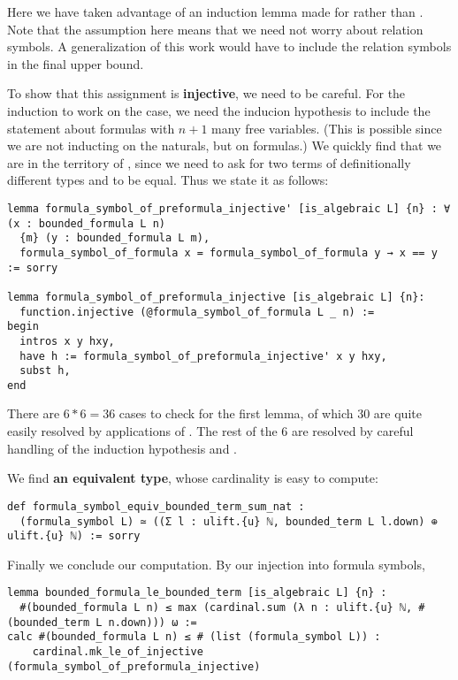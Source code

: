 Here we have taken advantage of an induction lemma made for 
rather than .
Note that the assumption  here means that we need not
worry about relation symbols.
A generalization of this work would have to include the relation symbols
in the final upper bound.

To show that this assignment is \textbf{injective},
we need to be careful.
For the induction to work on the  case,
we need the inducion hypothesis to include the statement about formulas
with $n+1$ many free variables.
(This is possible since we are not inducting on the naturals, but on formulas.)
We quickly find that we are in the territory of ,
since we need to ask for two terms of definitionally different types
 and  to be equal.
Thus we state it as follows:

\begin{lstlisting}
lemma formula_symbol_of_preformula_injective' [is_algebraic L] {n} : ∀ (x : bounded_formula L n)
  {m} (y : bounded_formula L m),
  formula_symbol_of_formula x = formula_symbol_of_formula y → x == y := sorry

lemma formula_symbol_of_preformula_injective [is_algebraic L] {n}:
  function.injective (@formula_symbol_of_formula L _ n) :=
begin
  intros x y hxy,
  have h := formula_symbol_of_preformula_injective' x y hxy,
  subst h,
end \end{lstlisting}

There are $6 * 6 = 36$ cases to check for the first lemma,
of which $30$ are quite easily resolved by applications of
.
The rest of the $6$ are resolved by careful handling of the induction
hypothesis and .

We find \textbf{an equivalent type}, whose cardinality is easy to compute:

\begin{lstlisting}
def formula_symbol_equiv_bounded_term_sum_nat :
  (formula_symbol L) ≃ ((Σ l : ulift.{u} ℕ, bounded_term L l.down) ⊕ ulift.{u} ℕ) := sorry \end{lstlisting}

Finally we conclude our computation.
By our injection into formula symbols,

\begin{lstlisting}
lemma bounded_formula_le_bounded_term [is_algebraic L] {n} :
  #(bounded_formula L n) ≤ max (cardinal.sum (λ n : ulift.{u} ℕ, #(bounded_term L n.down))) ω :=
calc #(bounded_formula L n) ≤ # (list (formula_symbol L)) :
    cardinal.mk_le_of_injective (formula_symbol_of_preformula_injective) \end{lstlisting}

